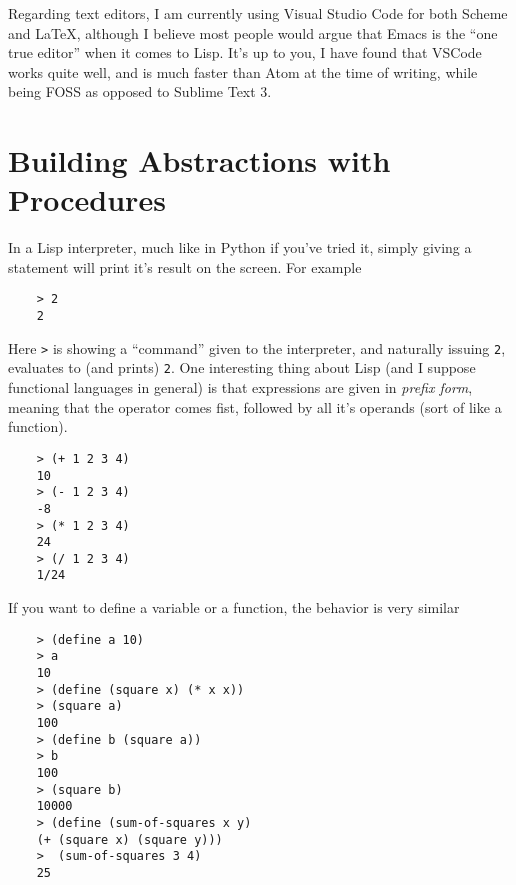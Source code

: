 \documentclass[11pt]{article}
\newcommand{\inline}{\texttt}
\begin{document}
Regarding text editors, I am currently using Visual Studio Code for both Scheme and LaTeX, although I believe most people would argue that Emacs is the ``one true editor'' when it comes to Lisp. It's up to you, I have found that VSCode works quite well, and is much faster than Atom at the time of writing, while being FOSS as opposed to Sublime Text 3.

\newpage
\section{Building Abstractions with Procedures}
In a Lisp interpreter, much like in Python if you've tried it, simply giving a statement will print it's result on the screen. For example
\begin{verbatim}
    > 2
    2
\end{verbatim}
Here \inline{>} is showing a ``command'' given to the interpreter, and naturally issuing \inline{2}, evaluates to (and prints) \inline{2}. One interesting thing about Lisp (and I suppose functional languages in general) is that expressions are given in \emph{prefix form}, meaning that the operator comes fist, followed by all it's operands (sort of like a function).
\begin{verbatim}
    > (+ 1 2 3 4)
    10
    > (- 1 2 3 4)
    -8
    > (* 1 2 3 4)
    24
    > (/ 1 2 3 4)
    1/24
\end{verbatim}

If you want to define a variable or a function, the behavior is very similar
\begin{verbatim}
    > (define a 10)
    > a
    10
    > (define (square x) (* x x))
    > (square a)
    100
    > (define b (square a))
    > b
    100
    > (square b)
    10000
    > (define (sum-of-squares x y)
    (+ (square x) (square y)))
    >  (sum-of-squares 3 4)
    25
\end{verbatim}
\end{document}
